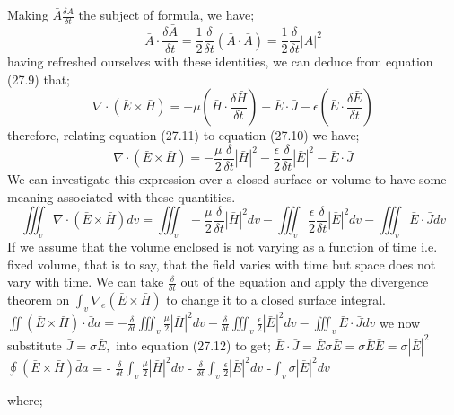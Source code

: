 Making $\bar{A}\frac{\delta A}{\delta t} $ the subject of formula,
we have;
\begin{dmath}
\bar{A}\cdot\frac{\delta\bar{A}}{\delta t}=\frac{1}{2}\frac{\delta}{\delta t}(\bar{A}\cdot\bar{A})=\frac{1}{2}\frac{\delta}{\delta t} |A|^{2} 
\end{dmath}
having refreshed ourselves with these identities, we can deduce from equation (27.9)  that;
\begin{dmath}
\nabla\cdot(\bar{E}\times\bar{H}) = -\mu\left(\bar{H}\cdot\frac{\delta\bar{H}}{\delta t}\right) - \bar{E}\cdot\bar{J} - \epsilon\left(\bar{E}\cdot\frac{\delta\bar{E}}{\delta t}\right)
\end{dmath}
therefore, relating equation (27.11) to equation (27.10) we have;
\begin{dmath}
\nabla\cdot(\bar{E}\times\bar{H})=-\frac{\mu}{2}\frac{\delta}{\delta t}|\bar{H}|^{2} -  \frac{\epsilon}{2}\frac{\delta}{\delta t}|\bar{E}|^{2}-\bar{E}\cdot\bar{J} 
\end{dmath}
We can investigate this expression over a closed surface or volume to have some meaning associated with these quantities.
\begin{dmath*}
\iiint_{v}\nabla\cdot(\bar{E}\times\bar{H})dv  = \iiint_v-\frac{\mu}{2}\frac{\delta}{\delta t}|\bar{H}|^{2}dv-
\iiint_{v}\frac{\epsilon}{2}\frac{\delta}{\delta t}|\bar{E}|^{2}dv -\iiint_{v}\bar{E}\cdot\bar{J}dv 
\end{dmath*}
If we assume that the volume enclosed is not varying as a function of time i.e. fixed volume, that is to say, that the field varies with time but space does not vary with time. We can take $\frac{\delta}{\delta t}$ out of the equation and apply the divergence theorem on $ \int_{v}\nabla_{e}(\bar{E}\times\bar{H}) $ to change it to a closed surface integral.
\begin{math}
\iint(\bar{E}\times\bar{H})\cdot\bar{d}a  =  -\frac{\delta}{\delta t}  \iiint_{v}\frac{\mu}{2}|\bar{H}|^{2}dv -  \frac{\delta}{\delta t}\iiint_{v}\frac{\epsilon}{2}|\bar{E}|^{2}dv  -  \iiint_{v}\bar{E}\cdot\bar{J}dv 
\end{math}
we now substitute $ \bar{J}=\sigma\bar{E}, $ into equation (27.12) to get; 
$\bar{E}\cdot\bar{J}=\bar{E}\sigma\bar{E}=\sigma\bar{E}\bar{E}=\sigma|\bar{E}|^{2} $
$ \oint(\bar{E}\times\bar{H})\bar{d}a $ = - $ \frac{\delta}{\delta t}\int_{v} \frac{\mu}{2}|\bar{H}|^{2}dv$ - $ \frac{\delta}{\delta t}\int_{v}\frac{\epsilon}{2}|\bar{E}|^{2}dv$
-$ \int_{v}\sigma|\bar{E}|^{2}dv $

where;


